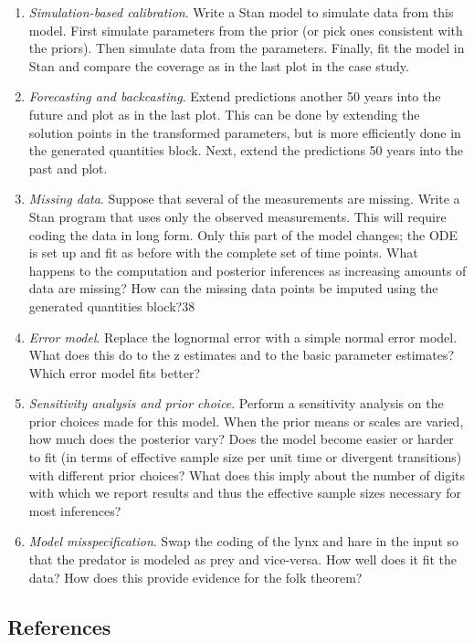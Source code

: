 \documentclass[]{tufte-handout}
\begin{document}
\begin{enumerate}
\def\labelenumi{\arabic{enumi}.}
\item
  \emph{Simulation-based calibration}. Write a Stan model to simulate
  data from this model. First simulate parameters from the prior (or
  pick ones consistent with the priors). Then simulate data from the
  parameters. Finally, fit the model in Stan and compare the coverage as
  in the last plot in the case study.
\item
  \emph{Forecasting and backcasting}. Extend predictions another 50
  years into the future and plot as in the last plot. This can be done
  by extending the solution points in the transformed parameters, but is
  more efficiently done in the generated quantities block. Next, extend
  the predictions 50 years into the past and plot.
\item
  \emph{Missing data}. Suppose that several of the measurements are
  missing. Write a Stan program that uses only the observed
  measurements. This will require coding the data in long form. Only
  this part of the model changes; the ODE is set up and fit as before
  with the complete set of time points. What happens to the computation
  and posterior inferences as increasing amounts of data are missing?
  How can the missing data points be imputed using the generated
  quantities block?38
\item
  \emph{Error model}. Replace the lognormal error with a simple normal
  error model. What does this do to the z estimates and to the basic
  parameter estimates? Which error model fits better?
\item
  \emph{Sensitivity analysis and prior choice}. Perform a sensitivity
  analysis on the prior choices made for this model. When the prior
  means or scales are varied, how much does the posterior vary? Does the
  model become easier or harder to fit (in terms of effective sample
  size per unit time or divergent transitions) with different prior
  choices? What does this imply about the number of digits with which we
  report results and thus the effective sample sizes necessary for most
  inferences?
\item
  \emph{Model misspecification}. Swap the coding of the lynx and hare in
  the input so that the predator is modeled as prey and vice-versa. How
  well does it fit the data? How does this provide evidence for the folk
  theorem?
\end{enumerate}

\hypertarget{references}{%
\subsection*{References}\label{references}}
\end{document}
